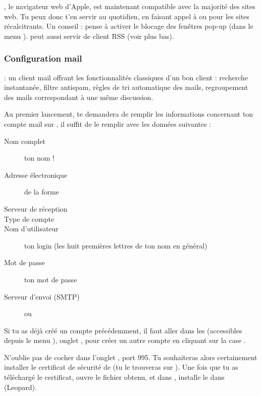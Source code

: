  , le navigateur web d'Apple, est maintenant compatible avec la majorité des sites web. Tu peux donc t'en servir au quotidien, en faisant appel à  ou  pour les sites récalcitrants. Un conseil : pense à activer le blocage des fenêtres pop-up (dans le menu ).  peut aussi servir de client RSS (voir plus bas).\\

\subsubsection{Configuration mail}



  : un client mail offrant les fonctionnalités classiques d'un bon client : recherche instantanée, filtre antispam, règles de tri automatique des mails, regroupement des mails correspondant à une même discussion.

Au premier lancement,  te demandera de remplir les informations concernant ton compte mail sur , il suffit de le remplir avec les données suivantes :

\begin{description}
  \item[Nom complet] ton nom !
  \item[Adresse électronique] de la forme 
  \item[Serveur de réception] 
  \item[Type de compte] 
  \item[Nom d'utilisateur] ton login  (les huit premières lettres de ton nom en général)
  \item[Mot de passe] ton mot de passe 
  \item[Serveur d'envoi (SMTP)]  ou 
\end{description}

Si tu as déjà créé un compte précédemment, il faut aller dans les  (accessibles depuis le menu ), onglet , pour créer un autre compte en cliquant sur la case \menu{+}.

N'oublie pas de cocher  dans l'onglet , port 995. Tu souhaiteras alors certainement installer le certificat de sécurité de  (tu le trouveras sur ). Une fois que tu as téléchargé le certificat, ouvre le fichier  obtenu, et dans , installe le dans %
 (Leopard).

